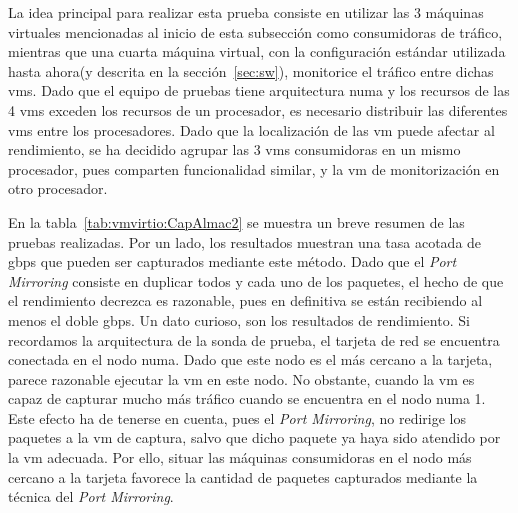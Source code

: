 La idea principal para realizar esta prueba consiste en utilizar las 3 máquinas virtuales mencionadas al inicio de esta subsección como consumidoras de tráfico, mientras que una cuarta máquina virtual, con la configuración estándar utilizada hasta ahora(y descrita en la sección~\ref{sec:sw}), monitorice el tráfico entre dichas \glspl{vm}.
Dado que el equipo de pruebas tiene arquitectura \gls{numa} y los recursos de las 4 \glspl{vm} exceden los recursos de un procesador, es necesario distribuir las diferentes \glspl{vm} entre los procesadores. Dado que la localización de las \gls{vm} puede afectar al rendimiento, se ha decidido agrupar las 3 \glspl{vm} consumidoras en un mismo procesador, pues comparten funcionalidad similar, y la \gls{vm} de monitorización en otro procesador. 

En la tabla~\ref{tab:vmvirtio:CapAlmac2} se muestra un breve resumen de las pruebas realizadas. Por un lado, los resultados muestran una tasa acotada de \gls{gbps} que pueden ser capturados mediante este método. Dado que el \textit{Port Mirroring} consiste en duplicar todos y cada uno de los paquetes, el hecho de que el rendimiento decrezca es razonable, pues en definitiva se están recibiendo al menos el doble \gls{gbps}.
Un dato curioso, son los resultados de rendimiento. Si recordamos la arquitectura de la sonda de prueba, el tarjeta de red se encuentra conectada en el nodo \gls{numa}. Dado que este nodo es el más cercano a la tarjeta, parece razonable ejecutar la \gls{vm} en este nodo. No obstante, cuando la \gls{vm} es capaz de capturar mucho más tráfico cuando se encuentra en el nodo \gls{numa} 1.
Este efecto ha de tenerse en cuenta, pues el \textit{Port Mirroring}, no redirige los paquetes a la \gls{vm} de captura, salvo que dicho paquete ya haya sido atendido por la \gls{vm} adecuada. Por ello, situar las máquinas consumidoras en el nodo más cercano a la tarjeta favorece la cantidad de paquetes capturados mediante la técnica del \textit{Port Mirroring}.

